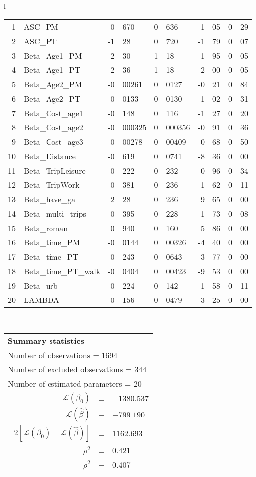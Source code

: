 \begin{tabular}{l}
\begin{tabular}{rlr@{.}lr@{.}lr@{.}lr@{.}l}
1 & ASC_PM  & -0&670 & 0&636 & -1&05 & 0&29\\
2 & ASC_PT & -1&28 & 0&720 & -1&79 & 0&07\\
3 & Beta_Age1_PM & 2&30 & 1&18 & 1&95 & 0&05\\
4 & Beta_Age1_PT & 2&36 & 1&18 & 2&00 & 0&05\\
5 & Beta_Age2_PM & -0&00261 & 0&0127 & -0&21 & 0&84\\
6 & Beta_Age2_PT & -0&0133 & 0&0130 & -1&02 & 0&31\\
7 & Beta_Cost_age1 & -0&148 & 0&116 & -1&27 & 0&20\\
8 & Beta_Cost_age2 & -0&000325 & 0&000356 & -0&91 & 0&36\\
9 & Beta_Cost_age3 & 0&00278 & 0&00409 & 0&68 & 0&50\\
10 & Beta_Distance & -0&619 & 0&0741 & -8&36 & 0&00\\
11 & Beta_TripLeisure & -0&222 & 0&232 & -0&96 & 0&34\\
12 & Beta_TripWork & 0&381 & 0&236 & 1&62 & 0&11\\
13 & Beta_have_ga & 2&28 & 0&236 & 9&65 & 0&00\\
14 & Beta_multi_trips & -0&395 & 0&228 & -1&73 & 0&08\\
15 & Beta_roman & 0&940 & 0&160 & 5&86 & 0&00\\
16 & Beta_time_PM & -0&0144 & 0&00326 & -4&40 & 0&00\\
17 & Beta_time_PT & 0&243 & 0&0643 & 3&77 & 0&00\\
18 & Beta_time_PT_walk & -0&0404 & 0&00423 & -9&53 & 0&00\\
19 & Beta_urb & -0&224 & 0&142 & -1&58 & 0&11\\
20 & LAMBDA & 0&156 & 0&0479 & 3&25 & 0&00\\
\hline
\end{tabular}
\\
\begin{tabular}{rcl}
\multicolumn{3}{l}{\bf Summary statistics}\\
\multicolumn{3}{l}{ Number of observations = $1694$} \\
\multicolumn{3}{l}{ Number of excluded observations = $344$} \\
\multicolumn{3}{l}{ Number of estimated  parameters = $20$} \\
 $\mathcal{L}(\beta_0)$ &=&  $-1380.537$ \\
 $\mathcal{L}(\hat{\beta})$ &=& $-799.190 $  \\
 $-2[\mathcal{L}(\beta_0) -\mathcal{L}(\hat{\beta})]$ &=& $1162.693$ \\
    $\rho^2$ &=&   $0.421$ \\
    $\bar{\rho}^2$ &=&    $0.407$ \\
\end{tabular}
  \end{tabular}
